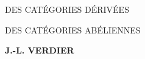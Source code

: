 \clearpage
\begingroup
  \thispagestyle{empty}
  \centering
  \vspace*{0.24\textheight}
  {\Huge DES CATÉGORIES DÉRIVÉES\par}
  \vspace{1.6em}
  {\Huge DES CATÉGORIES ABÉLIENNES\par}
  \vspace{7em}
  {\Large\bfseries J.-L. VERDIER\par}
  \vfill
\par
\endgroup
\clearpage
\setcounter{page}{1}
